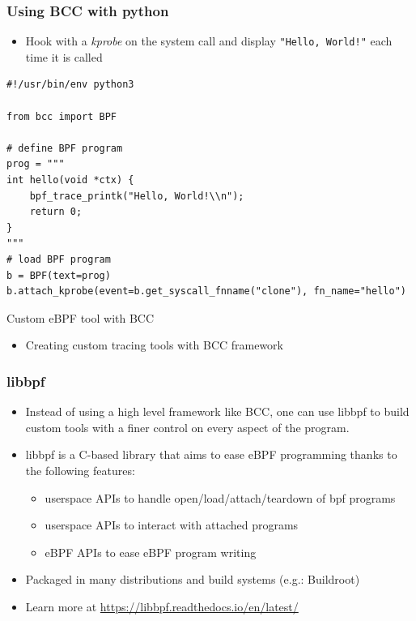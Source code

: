 \begin{frame}[fragile]
  \frametitle{Using BCC with python}
  \begin{itemize}
    \item Hook with a {\em kprobe} on the  system call and display \verb+"Hello, World!"+ each
          time it is called
  \end{itemize}
  \begin{block}{}
    \begin{verbatim}
#!/usr/bin/env python3

from bcc import BPF

# define BPF program
prog = """
int hello(void *ctx) {
    bpf_trace_printk("Hello, World!\\n");
    return 0;
}
"""
# load BPF program
b = BPF(text=prog)
b.attach_kprobe(event=b.get_syscall_fnname("clone"), fn_name="hello")
    \end{verbatim}
  \end{block}
\end{frame}

\setuplabframe
{Custom eBPF tool with BCC}
{
	\begin{itemize}
		\item Creating custom tracing tools with BCC framework
	\end{itemize}
}


\begin{frame}[fragile]
  \frametitle{libbpf}
  \begin{itemize}
    \item Instead of using a high level framework like BCC, one can use libbpf to
    build custom tools with a finer control on every aspect of the program.
    \item libbpf is a C-based library that aims to ease eBPF programming thanks
    to the following features:
    \begin{itemize}
      \item userspace APIs to handle open/load/attach/teardown of bpf programs
      \item userspace APIs to interact with attached programs
      \item eBPF APIs to ease eBPF program writing
    \end{itemize}
    \item Packaged in many distributions and build systems (e.g.: Buildroot)
    \item Learn more at \url{https://libbpf.readthedocs.io/en/latest/}
  \end{itemize}
\end{frame}

